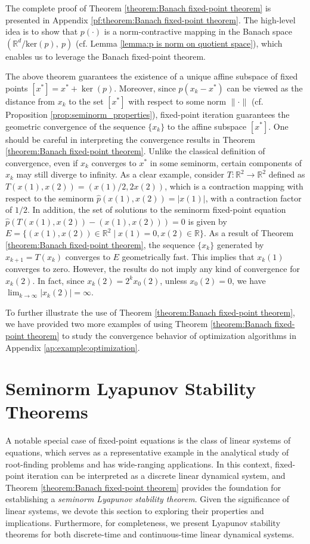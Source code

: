 \documentclass[11 pt]{article}
\begin{document}
	The complete proof of Theorem \ref{theorem:Banach fixed-point theorem} is presented in Appendix \ref{pf:theorem:Banach fixed-point theorem}. The high-level idea is to show that $p(\cdot)$ is a norm-contractive mapping in the Banach space $(\mathbb{R}^d / \text{ker}(p), ~p)$ (cf. Lemma \ref{lemma:p is norm on quotient space}), which enables us to leverage the Banach fixed-point theorem. 
	
	The above theorem guarantees the existence of a unique affine subspace of fixed points $[x^*]=x^*+\ker(p)$.  Moreover, since $p(x_k-x^*)$ can be viewed as the distance from $x_k$ to the set $[x^*]$ with respect to some norm $\| \cdot \|$ (cf. Proposition \ref{prop:seminorm_properties}), fixed-point iteration guarantees the geometric convergence of the sequence $\{x_k\}$ to the affine subspace $[x^*]$. One should be careful in interpreting the convergence results in Theorem \ref{theorem:Banach fixed-point theorem}. Unlike the classical definition of convergence, even if $x_k$ converges to $x^*$ in some seminorm, certain components of $x_k$ may still diverge to infinity. As a clear example, consider $T: \mathbb{R}^2 \to \mathbb{R}^2$ defined as $T(x(1), x(2)) = (x(1)/2, 2x(2))$, which is a contraction mapping with respect to the seminorm $\hat{p}(x(1), x(2)) = |x(1)|$, with a contraction factor of $1/2$. In addition, the set of solutions to the seminorm fixed-point equation $\hat{p}(T(x(1), x(2)) - (x(1), x(2))) = 0$ is given by $E = \{(x(1), x(2)) \in \mathbb{R}^2 \mid x(1) = 0, x(2) \in \mathbb{R}\}$. As a result of Theorem \ref{theorem:Banach fixed-point theorem}, the sequence $\{x_k\}$ generated by $x_{k+1} = T(x_k)$ converges to $E$ geometrically fast. This implies that $x_k(1)$ converges to zero. However, the results do not imply any kind of convergence for $x_k(2)$. In fact, since $x_k(2) = 2^k x_0(2)$, unless $x_0(2) = 0$, we have $\lim_{k \to \infty} |x_k(2)| = \infty$.
	
	
	
	
	To further illustrate the use of Theorem \ref{theorem:Banach fixed-point theorem}, we have provided two more examples of using Theorem \ref{theorem:Banach fixed-point theorem} to study the convergence behavior of optimization algorithms in Appendix \ref{ap:example:optimization}. 
	
	\section{Seminorm Lyapunov Stability Theorems}\label{sec:Lyapunov}
	A notable special case of fixed-point equations is the class of linear systems of equations, which serves as a representative example in the analytical study of root-finding problems and has wide-ranging applications. In this context, fixed-point iteration can be interpreted as a discrete linear dynamical system, and Theorem \ref{theorem:Banach fixed-point theorem} provides the foundation for establishing a \textit{seminorm Lyapunov stability theorem}. Given the significance of linear systems, we devote this section to exploring their properties and implications. Furthermore, for completeness, we present Lyapunov stability theorems for both discrete-time and continuous-time linear dynamical systems.
	
\end{document}
